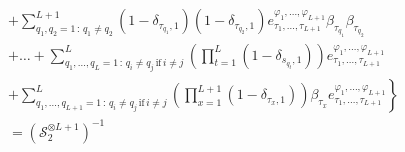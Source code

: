\documentclass[11pt]{article}
\numberwithin{equation}{section}
\numberwithin{equation}{subsection}
\begin{document}
\begin{align*}
    	\\&+\left. \sum_{q_{1},q_{2}=1\,:\,q_{1}\neq q_{2}}^{L+1}(1-\delta_{\tau_{q_{1}},1})(1-\delta_{\tau_{q_{2}},1})e_{\tau_{1},\ldots,\tau_{L+1}}^{\varphi_{1},\ldots,\varphi_{L+1}}\beta_{\tau_{q_{1}}}\beta_{\tau_{q_{2}}}\right.
    	\\&+\left.
    	\ldots+	\sum_{q_{1},\ldots,q_{L}=1\,:\,q_{i}\neq q_{j}\,\text{if}\,i\neq j}^{L}\left(\prod_{t=1}^{L}(1-\delta_{s_{q_{t}},1})\right)e_{\tau_{1},\ldots,\tau_{L+1}}^{\varphi_{1},\ldots,\varphi_{L+1}}
    	\right. \\&+ \left. 
    	\sum_{q_{1},\ldots,q_{L+1}=1\,:\,q_{i}\neq q_{j}\,\text{if}\,i\neq j}^{L}\left(\prod_{x=1}^{L+1}(1-\delta_{\tau_{x},1})\right)\beta_{\tau_{x}}e_{\tau_{1},\ldots,\tau_{L+1}}^{\varphi_{1},\ldots,\varphi_{L+1}} \right\}
    	\\&=
    	\left(\mathcal{S}_{2}^{\otimes L+1}\right)^{-1}
\end{align*}
\end{document}
